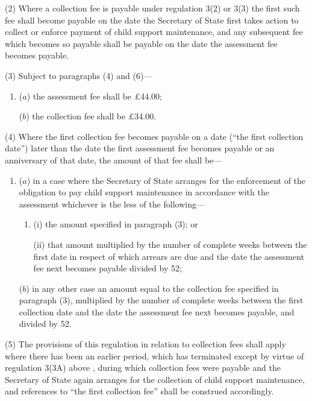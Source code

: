 \documentclass[a4paper]{article}
\begin{document}
(2) Where a collection fee is payable under regulation 3(2) or 3(3) the first such fee shall become payable on the date the Secretary of State first takes action to collect or enforce payment of child support maintenance, and any subsequent fee which becomes so payable shall be payable on the date the assessment fee becomes payable.

(3) Subject to paragraphs (4) and (6)—
\begin{enumerate}\item[]
($a$) the assessment fee shall be £44.00;

($b$) the collection fee shall be £34.00.
\end{enumerate}

(4) Where the first collection fee becomes payable on a date (“the first collection date”) later than the date the first assessment fee becomes payable or an anniversary of that date, 
the amount of that fee shall be—
\begin{enumerate}\item[]
($a$) in a case where the Secretary of State arranges for the enforcement of the obligation to pay child support maintenance in accordance with the assessment whichever is the less of the following—
\begin{enumerate}\item[]
(i) the amount specified in paragraph (3); or

(ii) that amount multiplied by the number of complete weeks between the first date in respect of which arrears are due and the date the assessment fee next becomes payable divided by 52;
\end{enumerate}

($b$) in any other case an amount equal to the collection fee specified in paragraph (3), multiplied by the number of complete weeks between the first collection date and the date the assessment fee next becomes payable, and divided by 52.
\end{enumerate}  %

(5) The provisions of this regulation in relation to collection fees shall apply where there has been an earlier period, which has terminated
except by virtue of regulation 3(3A) above%
, during which collection fees were payable and the Secretary of State again arranges for the collection of child support maintenance, and references to “the first collection fee” shall be construed accordingly.
\end{document}
